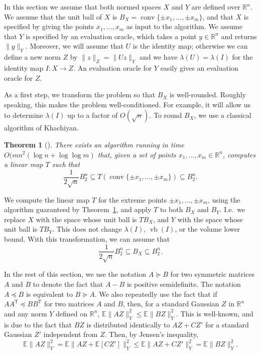 \documentclass[11pt]{article}
\newtheorem{theorem}{Theorem}
\newcommand{\R}{{\mathbb{R}}}
\newcommand{\E}{\mathbb{E}}
\newcommand{\T}{\mathsf T}
\DeclareMathOperator{\vb}{vb}
\DeclareMathOperator{\conv}{conv}
\begin{document}
In this section we assume that both normed spaces $X$ and $Y$ are
defined over $\R^n$. We assume that the unit ball of $X$ is $B_X =
\conv\{\pm x_1, \ldots, \pm x_m\}$, and that $X$ is specified by
giving the points $x_1, \ldots, x_m$ as input to the algorithm. We
assume that $Y$ is specified by an evaluation oracle, which takes a
point $y \in \R^n$ and returns $\|y\|_Y$. Moreover, we will assume
that $U$ is the identity map; otherwise we can define a new norm $Z$
by $\|z\|_Z = \|Uz\|_Y$ and we have $\lambda(U) = \lambda(I)$ for the
identity map $I:X \to Z$. An evaluation oracle for $Y$ easily gives an
evaluation oracle for $Z$.

As a first step, we transform the problem so that $B_X$ is
well-rounded. Roughly speaking, this makes the problem
well-conditioned. For example, it will allow us to determine
$\lambda(I)$ up to a factor of $O(\sqrt{n})$. To round
$B_X$, we use a classical algorithm of Khachiyan.

\begin{theorem}[\cite{Khachiyan96}]\label{thm:khach-round}
  There exists an algorithm running in time $O(mn^2(\log n + \log \log
  m)$ that, given a set of points $x_1, \ldots, x_m \in \R^n$,
  computes a linear map $T$ such that 
  \[
  \frac{1}{2\sqrt{n}} B_2^n \subseteq T(\conv\{\pm x_1, \ldots, \pm  x_m\})
  \subseteq
  B_2^n.
  \]
\end{theorem}

We compute the linear map $T$ for the extreme points $\pm x_1, \ldots,
\pm x_m$, using the algorithm guaranteed by
Theorem~\ref{thm:khach-round}, and apply $T$ to both $B_X$ and
$B_Y$. I.e.~we replace $X$ with the space whose unit ball is $TB_X$,
and $Y$ with the space whose unit ball is $TB_Y$. This does not change
$\lambda(I)$, $\vb(I)$, or the volume lower bound. With this
transformation, we can assume that 
\begin{equation}\label{eq:rounded}
  \frac{1}{2\sqrt{n}} B_2^n \subseteq B_X \subseteq B_2^n.
\end{equation}

In the rest of this section, we use the notation $A \succeq B$ for two symmetric matrices $A$ and $B$ to denote the fact
that $A-B$ is positive semidefinite. The
notation $A\preceq B$ is equivalent to $B \succeq A$. We also
repeatedly use the fact that if $AA^\T \preceq BB^\T$ for two matrices
$A$ and $B$, then, for a standard Gaussian $Z$ in $\R^n$ and any norm
$Y$ defined on $\R^n$, $\E \|AZ\|^2_Y \leq \E \|BZ\|_Y^2$. This is
well-known, and is due to the fact that $BZ$ is distributed
identically to $AZ + CZ'$
for a standard Gaussian $Z'$ independent from $Z$. Then, by Jensen's inequality,
\[
\E\|AZ\|^2_Y = \E\|AZ + \E[CZ']\|^2_Y
\le \E\|AZ + CZ'\|_Y^2 = \E\|BZ\|_Y^2.
\]
\end{document}
